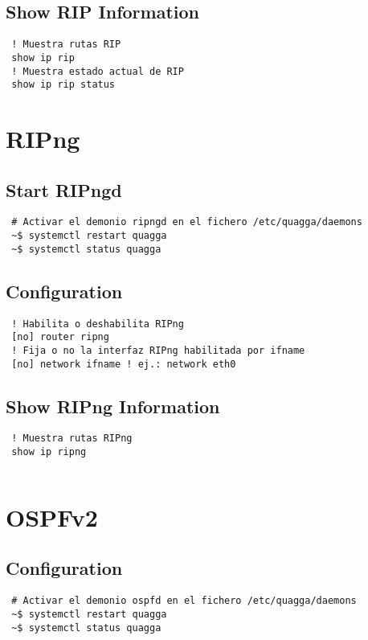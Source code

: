 \documentclass{article}
\begin{document}
\subsection{Show RIP Information}
\begin{verbatim}
 ! Muestra rutas RIP
 show ip rip
 ! Muestra estado actual de RIP
 show ip rip status
\end{verbatim}

\section{RIPng}
\subsection{Start RIPngd}
\begin{verbatim}
 # Activar el demonio ripngd en el fichero /etc/quagga/daemons
 ~$ systemctl restart quagga
 ~$ systemctl status quagga
\end{verbatim}

\subsection{Configuration}
\begin{verbatim}
 ! Habilita o deshabilita RIPng
 [no] router ripng
 ! Fija o no la interfaz RIPng habilitada por ifname
 [no] network ifname ! ej.: network eth0
\end{verbatim}

\subsection{Show RIPng Information}
\begin{verbatim}
 ! Muestra rutas RIPng
 show ip ripng
\end{verbatim}


\begin{verbatim}
\end{verbatim}

\section{OSPFv2}
\subsection{Configuration}
\begin{verbatim}
 # Activar el demonio ospfd en el fichero /etc/quagga/daemons
 ~$ systemctl restart quagga
 ~$ systemctl status quagga
\end{verbatim}
\end{document}
